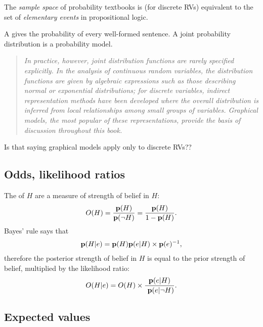 \begin{question}
\begin{intuition}
The {\it sample space} of probability textbooks is (for discrete RVs) equivalent to the set of {\it elementary events} in propositional logic.

A  gives the probability of every well-formed sentence. A joint probability distribution is a probability model.

\begin{quote}
  {\it In practice, however, joint distribution functions are rarely specified explicitly. In
    the analysis of continuous random variables, the distribution functions are given by
    algebraic expressions such as those describing normal or exponential distributions; for
    discrete variables, indirect representation methods have been developed where the overall
    distribution is inferred from local relationships among small groups of variables.
    Graphical models, the most popular of these representations, provide the basis of
    discussion throughout this book.}
\end{quote}

\begin{question}
  Is that saying graphical models apply only to discrete RVs??
\end{question}



\subsection{Odds, likelihood ratios}

The  of $H$ are a measure of strength of belief in $H$:
\begin{align*}
  O(H) = \frac{\mathbf{p}(H)}{\mathbf{p}(\lnot H)} = \frac{\mathbf{p}(H)}{1 - \mathbf{p}(H)}.
\end{align*}
Bayes' rule says that
\begin{align*}
 \mathbf{p}(H|e) = \mathbf{p}(H) \mathbf{p}(e|H) \times \mathbf{p}(e)^{-1},
\end{align*}
therefore the posterior strength of belief in $H$ is equal to the prior strength of belief, multiplied by the likelihood ratio:
\begin{align*}
  O(H|e) = O(H) \times \frac{\mathbf{p}(e|H)}{~\mathbf{p}(e|\lnot H)}.
\end{align*}

\subsection{Expected values}


\end{intuition}
\end{question}
